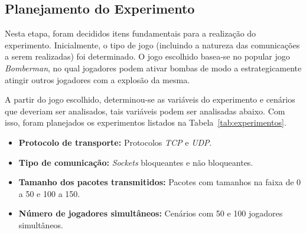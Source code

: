 \documentclass[12pt]{article}
\begin{document}
\subsection{Planejamento do Experimento} \label{sub:planejamento}

Nesta etapa, foram decididos itens fundamentais para a realização do
experimento. Inicialmente, o tipo de jogo (incluindo a natureza das
comunicações a serem realizadas) foi determinado. O jogo escolhido basea-se no
popular jogo \emph{Bomberman}, no qual jogadores podem ativar bombas de modo a
estrategicamente atingir outros jogadores com a explosão da mesma.

A partir do jogo escolhido, determinou-se as variáveis do experimento e
cenários que deveriam ser analisados, tais variáveis podem ser analisadas
abaixo. Com isso, foram planejados os experimentos listados na Tabela~\ref{tab:experimentos}.

\begin{itemize}
  \item \textbf{Protocolo de transporte:} Protocolos \emph{TCP} e \emph{UDP}.
  \item \textbf{Tipo de comunicação:} \emph{Sockets} bloqueantes e não bloqueantes.
  \item \textbf{Tamanho dos pacotes transmitidos:} Pacotes com tamanhos na faixa de 0 a 50 e 100 a 150.
  \item \textbf{Número de jogadores simultâneos:} Cenários com 50 e 100 jogadores simultâneos.
\end{itemize}
\end{document}
